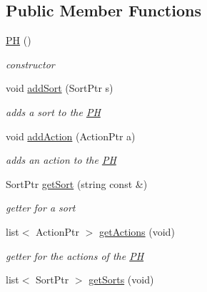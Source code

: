 \subsection*{Public Member Functions}
\begin{DoxyCompactItemize}
\item 
\hypertarget{classPH_ae3ab2dd87b4bfadf04c1a14c6091aebc}{\hyperlink{classPH_ae3ab2dd87b4bfadf04c1a14c6091aebc}{P\+H} ()}\label{classPH_ae3ab2dd87b4bfadf04c1a14c6091aebc}

\begin{DoxyCompactList}\small\item\em constructor \end{DoxyCompactList}\item 
void \hyperlink{classPH_ad4335e01899c57e6802021f1afb83e7f}{add\+Sort} (Sort\+Ptr s)
\begin{DoxyCompactList}\small\item\em adds a sort to the \hyperlink{classPH}{P\+H} \end{DoxyCompactList}\item 
void \hyperlink{classPH_ae9bed9356d272f3c43f2147d6d8e5906}{add\+Action} (Action\+Ptr a)
\begin{DoxyCompactList}\small\item\em adds an action to the \hyperlink{classPH}{P\+H} \end{DoxyCompactList}\item 
\hypertarget{classPH_a02f1cd90c270555a50c08caa0fb2d491}{Sort\+Ptr \hyperlink{classPH_a02f1cd90c270555a50c08caa0fb2d491}{get\+Sort} (string const \&)}\label{classPH_a02f1cd90c270555a50c08caa0fb2d491}

\begin{DoxyCompactList}\small\item\em getter for a sort \end{DoxyCompactList}\item 
\hypertarget{classPH_ae3ae50b901b63902ae4fc3262661bb5b}{list$<$ Action\+Ptr $>$ \hyperlink{classPH_ae3ae50b901b63902ae4fc3262661bb5b}{get\+Actions} (void)}\label{classPH_ae3ae50b901b63902ae4fc3262661bb5b}

\begin{DoxyCompactList}\small\item\em getter for the actions of the \hyperlink{classPH}{P\+H} \end{DoxyCompactList}\item 
\hypertarget{classPH_a99fd490a23ae915881d9d73f0b4cbfc5}{list$<$ Sort\+Ptr $>$ \hyperlink{classPH_a99fd490a23ae915881d9d73f0b4cbfc5}{get\+Sorts} (void)}\label{classPH_a99fd490a23ae915881d9d73f0b4cbfc5}


\end{DoxyCompactItemize}
